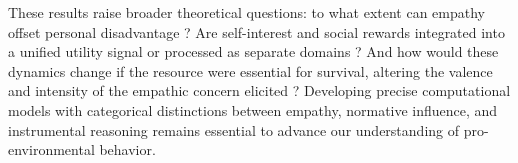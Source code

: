 These results raise broader theoretical questions: to what extent can empathy offset personal disadvantage ? Are self-interest and social rewards integrated into a unified utility signal or processed as separate domains ? And how would these dynamics change if the resource were essential for survival, altering the valence and intensity of the empathic concern elicited ? Developing precise computational models with categorical distinctions between empathy, normative influence, and instrumental reasoning remains essential to advance our understanding of pro-environmental behavior.





